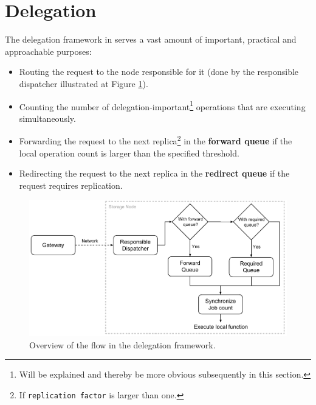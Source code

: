 \section{Delegation} \label{sec:delegation}
The delegation framework in \CodeName serves a vast amount of important, practical and approachable purposes:
\begin{itemize}
	\item Routing the request to the node responsible for it (done by the responsible dispatcher illustrated at Figure \ref{fig:delegation-framework}).
	\item Counting the number of delegation-important\footnote{\label{note:explained}Will be explained and thereby be more obvious subsequently in this section.} operations that are executing simultaneously.
	\item Forwarding the request to the next replica\footnote{\label{note:replication-factor}If \texttt{replication factor} is larger than one.} in the \textbf{forward queue} if the local operation count is larger than the specified threshold.
	\item Redirecting the request to the next replica in the \textbf{redirect queue} if the request requires replication.
\end{itemize}
\vspace*{4mm}

\begin{figure}[ht!]
	\centering
	\vspace*{5mm}
	\includegraphics[scale=0.8]{pdf/delegation-framework.pdf}
	\caption[Overview of the delegation framework]{Overview of the flow in the delegation framework. \label{fig:delegation-framework}}
	\vspace*{5mm}
\end{figure}	

